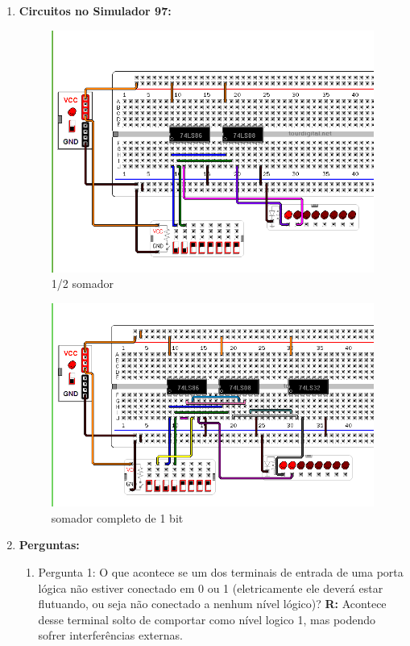 \documentclass[a4paper,11pt]{article}
\begin{document}
\begin{enumerate}
\begin{figure}[ht]
        \end{figure}
        \newpage
    \item \textbf{Circuitos no Simulador 97:}
        \begin{figure}[ht]
            \vspace{-0.2cm}
            \caption{1/2 somador}
            \centering
            \includegraphics[width=11cm]{simulador97-meioSomador}
        \end{figure}  
        \begin{figure}[ht]
            \vspace{-1cm}
            \caption{somador completo de 1 bit}
            \centering
            \includegraphics[width=11cm]{simulador97-somadorCompleto}
        \end{figure}
        \newpage
    \item \textbf{Perguntas:}
        \begin{enumerate}
            \item{Pergunta 1: O que acontece se um dos terminais de entrada de uma porta lógica não
                    estiver conectado em 0 ou 1 (eletricamente ele deverá estar flutuando, ou seja não
                    conectado a nenhum nível lógico)?} 
                \newline 
                \textbf{R:} Acontece desse terminal solto de comportar como nível logico 1, mas podendo
                sofrer interferências externas.
                \bigskip


\end{enumerate}
\end{enumerate}
\end{document}
